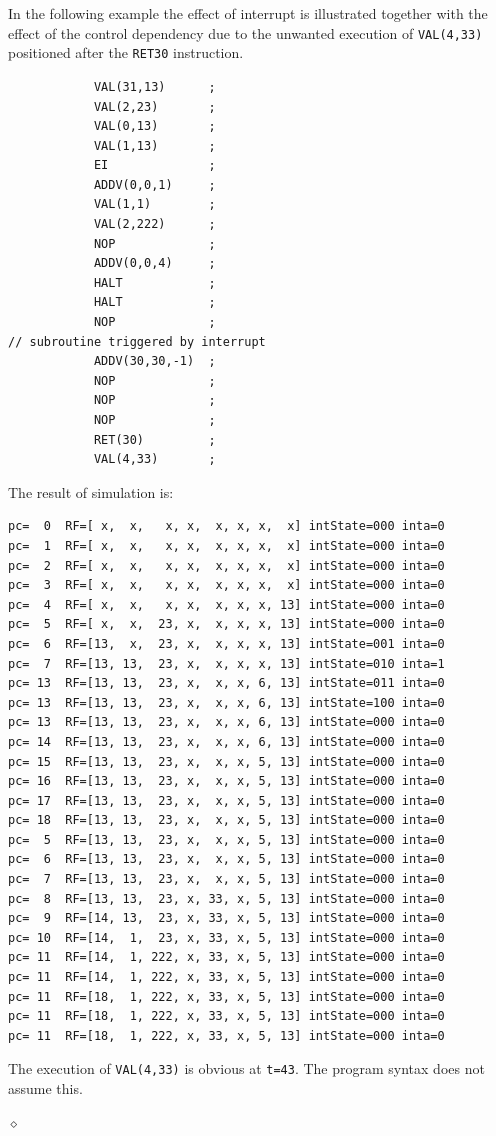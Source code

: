 \begin{exemplu}
In the following example the effect of interrupt is illustrated together with  the effect of the control dependency due to the unwanted  execution of {\tt VAL(4,33)} positioned after the {\tt RET{30}} instruction.
\begin{verbatim}
            VAL(31,13)      ;
            VAL(2,23)       ;
            VAL(0,13)       ;
            VAL(1,13)       ;
            EI              ;
            ADDV(0,0,1)     ;
            VAL(1,1)        ;
            VAL(2,222)      ;
            NOP             ;
            ADDV(0,0,4)     ;
            HALT            ;
            HALT            ;
            NOP             ;
// subroutine triggered by interrupt
            ADDV(30,30,-1)  ;
            NOP             ;
            NOP             ;
            NOP             ;
            RET(30)         ;
            VAL(4,33)       ;
\end{verbatim}
The result of simulation is:
{\small
\begin{verbatim}
pc=  0  RF=[ x,  x,   x, x,  x, x, x,  x] intState=000 inta=0
pc=  1  RF=[ x,  x,   x, x,  x, x, x,  x] intState=000 inta=0
pc=  2  RF=[ x,  x,   x, x,  x, x, x,  x] intState=000 inta=0
pc=  3  RF=[ x,  x,   x, x,  x, x, x,  x] intState=000 inta=0
pc=  4  RF=[ x,  x,   x, x,  x, x, x, 13] intState=000 inta=0
pc=  5  RF=[ x,  x,  23, x,  x, x, x, 13] intState=000 inta=0
pc=  6  RF=[13,  x,  23, x,  x, x, x, 13] intState=001 inta=0
pc=  7  RF=[13, 13,  23, x,  x, x, x, 13] intState=010 inta=1
pc= 13  RF=[13, 13,  23, x,  x, x, 6, 13] intState=011 inta=0
pc= 13  RF=[13, 13,  23, x,  x, x, 6, 13] intState=100 inta=0
pc= 13  RF=[13, 13,  23, x,  x, x, 6, 13] intState=000 inta=0
pc= 14  RF=[13, 13,  23, x,  x, x, 6, 13] intState=000 inta=0
pc= 15  RF=[13, 13,  23, x,  x, x, 5, 13] intState=000 inta=0
pc= 16  RF=[13, 13,  23, x,  x, x, 5, 13] intState=000 inta=0
pc= 17  RF=[13, 13,  23, x,  x, x, 5, 13] intState=000 inta=0
pc= 18  RF=[13, 13,  23, x,  x, x, 5, 13] intState=000 inta=0
pc=  5  RF=[13, 13,  23, x,  x, x, 5, 13] intState=000 inta=0
pc=  6  RF=[13, 13,  23, x,  x, x, 5, 13] intState=000 inta=0
pc=  7  RF=[13, 13,  23, x,  x, x, 5, 13] intState=000 inta=0
pc=  8  RF=[13, 13,  23, x, 33, x, 5, 13] intState=000 inta=0
pc=  9  RF=[14, 13,  23, x, 33, x, 5, 13] intState=000 inta=0
pc= 10  RF=[14,  1,  23, x, 33, x, 5, 13] intState=000 inta=0
pc= 11  RF=[14,  1, 222, x, 33, x, 5, 13] intState=000 inta=0
pc= 11  RF=[14,  1, 222, x, 33, x, 5, 13] intState=000 inta=0
pc= 11  RF=[18,  1, 222, x, 33, x, 5, 13] intState=000 inta=0
pc= 11  RF=[18,  1, 222, x, 33, x, 5, 13] intState=000 inta=0
pc= 11  RF=[18,  1, 222, x, 33, x, 5, 13] intState=000 inta=0
\end{verbatim}
}
The execution of {\tt VAL(4,33)} is obvious at {\tt t=43}. The program syntax does not assume this.

$\diamond$
\end{exemplu}

